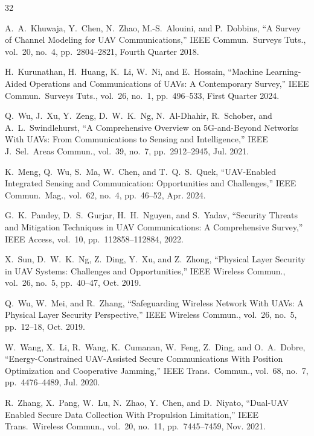 \documentclass[journal]{IEEEtran}
\begin{document}
\begin{thebibliography}{32}

A.~A.~Khuwaja, Y.~Chen, N.~Zhao, M.-S.~Alouini, and P.~Dobbins,
``A Survey of Channel Modeling for UAV Communications,''
IEEE Commun.\ Surveys Tuts., vol.~20, no.~4, pp.~2804--2821, Fourth Quarter 2018.

H.~Kurunathan, H.~Huang, K.~Li, W.~Ni, and E.~Hossain,
``Machine Learning-Aided Operations and Communications of UAVs: A Contemporary Survey,''
IEEE Commun.\ Surveys Tuts., vol.~26, no.~1, pp.~496--533, First Quarter 2024.

Q.~Wu, J.~Xu, Y.~Zeng, D.~W.~K.~Ng, N.~Al-Dhahir, R.~Schober, and A.~L.~Swindlehurst,
``A Comprehensive Overview on 5G-and-Beyond Networks With UAVs: From Communications to Sensing and Intelligence,''
IEEE J.\ Sel.\ Areas Commun., vol.~39, no.~7, pp.~2912--2945, Jul. 2021.

K.~Meng, Q.~Wu, S.~Ma, W.~Chen, and T.~Q.~S.~Quek,
``UAV-Enabled Integrated Sensing and Communication: Opportunities and Challenges,''
IEEE Commun.\ Mag., vol.~62, no.~4, pp.~46--52, Apr. 2024.

G.~K.~Pandey, D.~S.~Gurjar, H.~H.~Nguyen, and S.~Yadav,
``Security Threats and Mitigation Techniques in UAV Communications: A Comprehensive Survey,''
IEEE Access, vol.~10, pp.~112858--112884, 2022.

X.~Sun, D.~W.~K.~Ng, Z.~Ding, Y.~Xu, and Z.~Zhong,
``Physical Layer Security in UAV Systems: Challenges and Opportunities,''
IEEE Wireless Commun., vol.~26, no.~5, pp.~40--47, Oct. 2019.

Q.~Wu, W.~Mei, and R.~Zhang,
``Safeguarding Wireless Network With UAVs: A Physical Layer Security Perspective,''
IEEE Wireless Commun., vol.~26, no.~5, pp.~12--18, Oct. 2019.

W.~Wang, X.~Li, R.~Wang, K.~Cumanan, W.~Feng, Z.~Ding, and O.~A.~Dobre,
``Energy-Constrained UAV-Assisted Secure Communications With Position Optimization and Cooperative Jamming,''
IEEE Trans.\ Commun., vol.~68, no.~7, pp.~4476--4489, Jul. 2020.

R.~Zhang, X.~Pang, W.~Lu, N.~Zhao, Y.~Chen, and D.~Niyato,
``Dual-UAV Enabled Secure Data Collection With Propulsion Limitation,''
IEEE Trans.\ Wireless Commun., vol.~20, no.~11, pp.~7445--7459, Nov. 2021.


\end{thebibliography}
\end{document}
